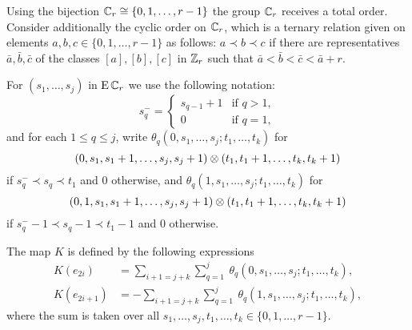 Using the bijection $\mathbb{C}_r\cong\{0,1,\dots,r-1\}$ the group $\mathbb{C}_r$ receives a total order.
Consider additionally the cyclic order on $\mathbb{C}_r$, which is a ternary relation given on elements $a,b,c\in \{0,1,\dots,r-1\}$ as follows: $a\prec b\prec c$
if there are representatives $\bar{a},\bar{b},\bar{c}$ of the classes $[a],[b],[c]$ in $\mathbb{Z}_r$ such that $\bar{a}<\bar{b}<\bar{c}<\bar{a}+r$.

For $(s_1,\dots,s_j)$ in $\operatorname{E}\mathbb{C}_r$ we use the following notation:
\[
s_q^- =
\begin{cases}
	s_{q-1}+1 & \text{if } q>1, \\
	0 & \text{if } q=1,
\end{cases}
\]
and for each $1\leq q\leq j$, write $\theta_q(0,s_1,\dots,s_j;t_1,\dots,t_k)$ for
\[
(0,s_1,s_1+1,\dots,s_j,s_j+1)\otimes (t_1,t_1+1,\dots,t_k,t_k+1)
\]
if $s_q^- \prec s_q \prec t_1$ and $0$ otherwise, and $\theta_q(1,s_1,\dots,s_j;t_1,\dots,t_k)$ for
\[
(0,1,s_1,s_1+1,\dots,s_j,s_j+1)\otimes (t_1,t_1+1,\dots,t_k,t_k+1)
\]
if $s_q^--1 \prec s_q-1 \prec t_1-1$ and $0$ otherwise.

\begin{lemma}
	The map $K$ is defined by the following expressions
	\begin{align} \label{eq:homotopyK'1}
		K(e_{2i}) &= \sum_{i+1 = j+k} \sum_{q=1}^j \
		\theta_q(0,s_1,\dots,s_j;t_1,\dots,t_k), \\ \label{eq:homotopyK'2}
		K(e_{2i+1}) &= -\sum_{i+1 = j+k} \sum_{q=1}^j \
		\theta_q(1,s_1,\dots,s_j;t_1,\dots,t_k),
	\end{align}
	where the sum is taken over all $s_1,\dots,s_j,t_1,\dots,t_k\in \{0,1,\dots,r-1\}$.
\end{lemma}

